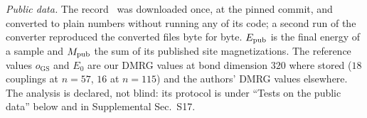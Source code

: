 \documentclass[aps,prx,twocolumn,10pt,superscriptaddress,nofootinbib,longbibliography,floatfix]{revtex4-2}
\theoremstyle{remark}
\newcommand{\GS}{\mathrm{GS}}
\begin{document}
\emph{Public data.} The record~\cite{jaderberg2026data} was downloaded once, at the pinned commit, and converted to
plain numbers without running any of its code; a second run of the converter reproduced the converted files byte for
byte. $E_{\rm pub}$ is the final energy of a sample and $M_{\rm pub}$ the sum of its published site magnetizations.
The reference values $o_\GS$ and $E_0$ are our DMRG values at bond dimension $320$ where stored ($18$ couplings at %
$n=57$, $16$ at $n=115$) and the authors' DMRG values elsewhere. The analysis is declared, not blind: its protocol %
is under ``Tests on the public data'' below and in Supplemental Sec.~S17.
\end{document}
